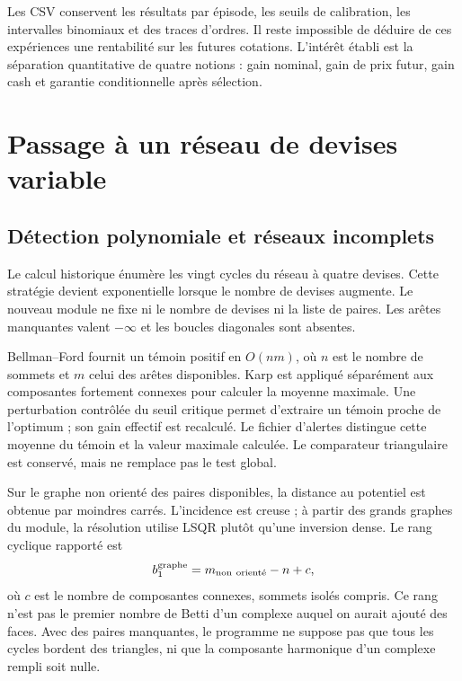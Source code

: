 Les CSV conservent les résultats par épisode, les seuils de calibration, les intervalles binomiaux et des traces d'ordres. Il reste impossible de déduire de ces expériences une rentabilité sur les futures cotations. L'intérêt établi est la séparation quantitative de quatre notions : gain nominal, gain de prix futur, gain cash et garantie conditionnelle après sélection.

\clearpage
\section{Passage à un réseau de devises variable}
\label{sec:ext-scale}

\subsection{Détection polynomiale et réseaux incomplets}

Le calcul historique énumère les vingt cycles du réseau à quatre devises. Cette stratégie devient exponentielle lorsque le nombre de devises augmente. Le nouveau module  ne fixe ni le nombre de devises ni la liste de paires. Les arêtes manquantes valent \(-\infty\) et les boucles diagonales sont absentes.

Bellman--Ford fournit un témoin positif en \(O(nm)\), où \(n\) est le nombre de sommets et \(m\) celui des arêtes disponibles. Karp est appliqué séparément aux composantes fortement connexes pour calculer la moyenne maximale. Une perturbation contrôlée du seuil critique permet d'extraire un témoin proche de l'optimum ; son gain effectif est recalculé. Le fichier d'alertes distingue cette moyenne du témoin et la valeur maximale calculée. Le comparateur triangulaire est conservé, mais ne remplace pas le test global.

Sur le graphe non orienté des paires disponibles, la distance au potentiel est obtenue par moindres carrés. L'incidence est creuse ; à partir des grands graphes du module, la résolution utilise LSQR plutôt qu'une inversion dense. Le rang cyclique rapporté est
\begin{equation}
 b_1^{\rm graphe}=m_{\rm non\ orient\acute e}-n+c,
\end{equation}
où \(c\) est le nombre de composantes connexes, sommets isolés compris. Ce rang n'est pas le premier nombre de Betti d'un complexe auquel on aurait ajouté des faces. Avec des paires manquantes, le programme ne suppose pas que tous les cycles bordent des triangles, ni que la composante harmonique d'un complexe rempli soit nulle.

